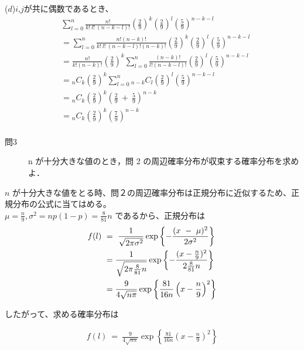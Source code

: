 \documentclass[12pt,a4paper]{jsarticle}
\begin{document}
($d$)$i$,$j$が共に偶数であるとき、\\
\begin{align*}
    & \sum^n_{l = 0} \frac{n!}{k!~l!~(n-k-l)!} \left(\frac{2}{9}\right)^k \left(\frac{2}{9}\right)^l \left(\frac{5}{9}\right)^{n-k-l} \\
    &= \sum^n_{l = 0} \frac{n!(n-k)!}{k!~l!~(n-k-l)!(n-k)!} \left(\frac{2}{9}\right)^k \left(\frac{2}{9}\right)^l \left(\frac{5}{9}\right)^{n-k-l} \\
    &= \frac{n!}{k!(n-k)!}\left(\frac{2}{9}\right)^k \sum^n_{l = 0}\frac{(n-k)!}{l!(n-k-l)!}\left(\frac{2}{9}\right)^l\left(\frac{5}{9}\right)^{n-k-l} \\
    &= {}_n C_k \left(\frac{2}{9}\right)^k \sum^n_{l = 0} {}_{n-k} C_l \left(\frac{2}{9}\right)^l\left(\frac{5}{9}\right)^{n-k-l} \\
    &= {}_n C_k \left(\frac{2}{9}\right)^k \left(\frac{2}{9}~+~\frac{5}{9}\right)^{n-k} \\
    &= {}_n C_k \left(\frac{2}{9}\right)^k \left(\frac{7}{9}\right)^{n-k}\\
\end{align*}


\begin{description}
    \item [問3] n が十分大きな値のとき，問 2 の周辺確率分布が収束する確率分布を求めよ．
\end{description}

$ \displaystyle n $ が十分大きな値をとる時、問２の周辺確率分布は正規分布に近似するため、正規分布の公式に当てはめる。\\
$ \displaystyle \mu = \frac{n}{9},\sigma ^ 2 = np(1-p) = \frac{8}{81}n $ であるから、正規分布は\\

\begin{align*}
    {\displaystyle}f(l)~&=~\frac{1}{\sqrt{2{\pi}{\sigma}^2}}\exp\left\{-\frac{(x ~-~ \mu)^2}{2\sigma^2}\right\} \\
    &= \frac{1}{\sqrt{2{\pi}\frac{8}{81}n}}\exp\left\{-\frac{(x-\frac{n}{9})^2}{2\frac{8}{81}n}\right\} \\
    &= \frac{9}{4\sqrt{n{\pi}}} \exp \left\{\frac{81}{16n}\left(x-\frac{n}{9}\right)^2\right\}
\end{align*}

したがって、求める確率分布は

\begin{align*}
    f(l) ~=~ \frac{9}{4\sqrt{n{\pi}}} \exp \left\{\frac{81}{16n}\left(x-\frac{n}{9}\right)^2\right\}\\
\end{align*}
\end{document}

